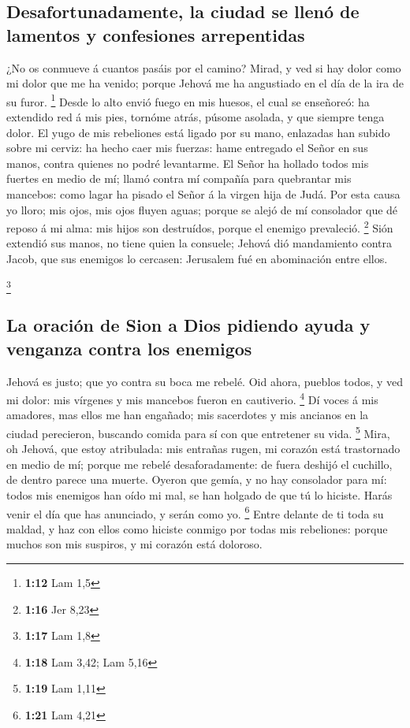 \hypertarget{desafortunadamente-la-ciudad-se-llenuxf3-de-lamentos-y-confesiones-arrepentidas}{%
\subsection{Desafortunadamente, la ciudad se llenó de lamentos y
confesiones
arrepentidas}\label{desafortunadamente-la-ciudad-se-llenuxf3-de-lamentos-y-confesiones-arrepentidas}}

 ¿No os conmueve á cuantos pasáis por el camino? Mirad, y
ved si hay dolor como mi dolor que me ha venido; porque Jehová me ha
angustiado en el día de la ira de su furor. \footnote{\textbf{1:12} Lam
  1,5}  Desde lo alto envió fuego en mis huesos, el cual
se enseñoreó: ha extendido red á mis pies, tornóme atrás, púsome
asolada, y que siempre tenga dolor.  El yugo de mis
rebeliones está ligado por su mano, enlazadas han subido sobre mi
cerviz: ha hecho caer mis fuerzas: hame entregado el Señor en sus manos,
contra quienes no podré levantarme.  El Señor ha hollado
todos mis fuertes en medio de mí; llamó contra mí compañía para
quebrantar mis mancebos: como lagar ha pisado el Señor á la virgen hija
de Judá.  Por esta causa yo lloro; mis ojos, mis ojos
fluyen aguas; porque se alejó de mí consolador que dé reposo á mi alma:
mis hijos son destruídos, porque el enemigo prevaleció. \footnote{\textbf{1:16}
  Jer 8,23}  Sión extendió sus manos, no tiene quien la
consuele; Jehová dió mandamiento contra Jacob, que sus enemigos lo
cercasen: Jerusalem fué en abominación entre ellos.

\footnote{\textbf{1:17} Lam 1,8}

\hypertarget{la-oraciuxf3n-de-sion-a-dios-pidiendo-ayuda-y-venganza-contra-los-enemigos}{%
\subsection{La oración de Sion a Dios pidiendo ayuda y venganza contra
los
enemigos}\label{la-oraciuxf3n-de-sion-a-dios-pidiendo-ayuda-y-venganza-contra-los-enemigos}}

 Jehová es justo; que yo contra su boca me rebelé. Oid
ahora, pueblos todos, y ved mi dolor: mis vírgenes y mis mancebos fueron
en cautiverio. \footnote{\textbf{1:18} Lam 3,42; Lam 5,16}
 Dí voces á mis amadores, mas ellos me han engañado; mis
sacerdotes y mis ancianos en la ciudad perecieron, buscando comida para
sí con que entretener su vida. \footnote{\textbf{1:19} Lam 1,11}
 Mira, oh Jehová, que estoy atribulada: mis entrañas
rugen, mi corazón está trastornado en medio de mí; porque me rebelé
desaforadamente: de fuera deshijó el cuchillo, de dentro parece una
muerte.  Oyeron que gemía, y no hay consolador para mí:
todos mis enemigos han oído mi mal, se han holgado de que tú lo hiciste.
Harás venir el día que has anunciado, y serán como yo. \footnote{\textbf{1:21}
  Lam 4,21}  Entre delante de ti toda su maldad, y haz
con ellos como hiciste conmigo por todas mis rebeliones: porque muchos
son mis suspiros, y mi corazón está doloroso.

